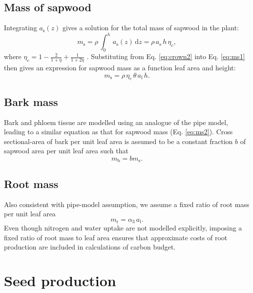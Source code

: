 \documentclass[10pt,twoside]{article}
\begin{document}
\subsection{Mass of sapwood}\label{mass-of-sapwood}

Integrating \(a_\textrm{s}(z)\) gives a solution for the total mass of
sapwood in the plant:
\begin{equation}\label{eq:ms1}
m_\textrm{s}=\rho \, \int_0^h \, a_\textrm{s}(z) \, \textrm{d}z= \rho \, a_\textrm{s} \, h \, \eta_c, 
\end{equation}
where \(\eta_c=1-\frac{2}{1+\eta} + \frac{1}{1+2\eta}\)
\citep{Yokozawa-1995}. Substituting from Eq. \ref{eq:crown2} into Eq.
\ref{eq:ms1} then gives an expression for sapwood mass as a function
leaf area and height:
\begin{equation}\label{eq:ms2}
m_\textrm{s}=\rho \, \eta_c \, \theta \, a_\textrm{l} \, h.
\end{equation}

\subsection{Bark mass}\label{bark-mass}

Bark and phloem tissue are modelled using an analogue of the pipe model,
leading to a similar equation as that for sapwood mass (Eq.
\ref{eq:ms2}). Cross sectional-area of bark per unit leaf area is
assumed to be a constant fraction \(b\) of sapwood area per unit leaf
area such that
\begin{equation}\label{eq:mb}
m_\textrm{b}=b m_\textrm{s}.
\end{equation}

\subsection{Root mass}\label{root-mass}

Also consistent with pipe-model assumption, we assume a fixed ratio of
root mass per unit leaf area
\begin{equation}\label{eq:mr}
m_\textrm{r}=\alpha_3 \, a_\textrm{l}.
\end{equation}
Even though nitrogen and water uptake are not modelled explicitly,
imposing a fixed ratio of root mass to leaf area ensures that
approximate costs of root production are included in calculations of
carbon budget.

\section{Seed production}\label{seed-production}
\end{document}
